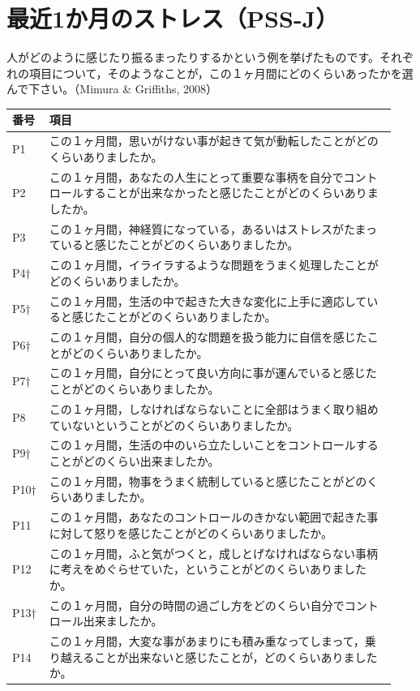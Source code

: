 \section*{最近1か月のストレス（PSS-J）}
\noindent 人がどのように感じたり振るまったりするかという例を挙げたものです。それぞれの項目について，そのようなことが，この１ヶ月間にどのくらいあったかを選んで下さい。（Mimura \& Griffiths, 2008）\\
\begin{longtable}{@{}p{0.08\linewidth}p{0.86\linewidth}@{}}
\toprule 番号 & 項目 \\ \midrule \endhead \bottomrule \endfoot
P1 & この１ヶ月間，思いがけない事が起きて気が動転したことがどのくらいありましたか。 \\
P2 & この１ヶ月間，あなたの人生にとって重要な事柄を自分でコントロールすることが出来なかったと感じたことがどのくらいありましたか。 \\
P3 & この１ヶ月間，神経質になっている，あるいはストレスがたまっていると感じたことがどのくらいありましたか。 \\
P4† & この１ヶ月間，イライラするような問題をうまく処理したことがどのくらいありましたか。 \\
P5† & この１ヶ月間，生活の中で起きた大きな変化に上手に適応していると感じたことがどのくらいありましたか。 \\
P6† & この１ヶ月間，自分の個人的な問題を扱う能力に自信を感じたことがどのくらいありましたか。 \\
P7† & この１ヶ月間，自分にとって良い方向に事が運んでいると感じたことがどのくらいありましたか。 \\
P8 & この１ヶ月間，しなければならないことに全部はうまく取り組めていないということがどのくらいありましたか。 \\
P9† & この１ヶ月間，生活の中のいら立たしいことをコントロールすることがどのくらい出来ましたか。 \\
P10† & この１ヶ月間，物事をうまく統制していると感じたことがどのくらいありましたか。 \\
P11 & この１ヶ月間，あなたのコントロールのきかない範囲で起きた事に対して怒りを感じたことがどのくらいありましたか。 \\
P12 & この１ヶ月間，ふと気がつくと，成しとげなければならない事柄に考えをめぐらせていた，ということがどのくらいありましたか。 \\
P13† & この１ヶ月間，自分の時間の過ごし方をどのくらい自分でコントロール出来ましたか。 \\
P14 & この１ヶ月間，大変な事があまりにも積み重なってしまって，乗り越えることが出来ないと感じたことが，どのくらいありましたか。 \\
\end{longtable}
